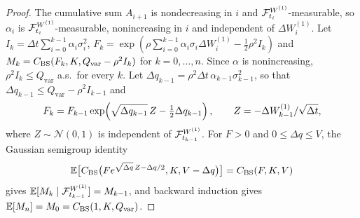 \begin{proof}
The cumulative sum $A_{i+1}$ is nondecreasing in $i$ and $\mathcal{F}_{t_i}^{W^{(1)}}$-measurable, so $\alpha_i$ is $\mathcal{F}_{t_i}^{W^{(1)}}$-measurable, nonincreasing in $i$ and independent of $\Delta W_i^{(1)}$. Let $I_k=\Delta t\sum_{i=0}^{k-1}\alpha_i\sigma_i^2$, $F_k=\exp(\rho\sum_{i=0}^{k-1}\alpha_i\sigma_i\Delta W_i^{(1)}-\tfrac12\rho^2 I_k)$ and $M_k=C_{\mathrm{BS}}(F_k,K,Q_{\mathrm{var}}-\rho^2 I_k)$ for $k=0,\dots,n$. Since $\alpha$ is nonincreasing, $\rho^2I_k\le Q_{\mathrm{var}}$ a.s.\ for every $k$. Let $\Delta q_{k-1}=\rho^2\Delta t\,\alpha_{k-1}\sigma_{k-1}^2$, so that $\Delta q_{k-1}\le Q_{\mathrm{var}}-\rho^2 I_{k-1}$ and
\[
  \begin{gathered}
  F_k=F_{k-1}\exp\!\left(\sqrt{\Delta q_{k-1}}\,Z-\tfrac12\Delta q_{k-1}\right),\qquad Z=-\Delta W_{k-1}^{(1)}/\sqrt{\Delta t},
  \end{gathered}
\]
where $Z\sim\mathcal{N}(0,1)$ is independent of $\mathcal{F}_{t_{k-1}}^{W^{(1)}}$. For $F>0$ and $0\le\Delta q\le V$, the Gaussian semigroup identity
\[
  \mathbb{E}\bigl[C_{\mathrm{BS}}\bigl(F e^{\sqrt{\Delta q}\,Z-\Delta q/2},K,V-\Delta q\bigr)\bigr]=C_{\mathrm{BS}}(F,K,V)
\]
gives $\mathbb{E}[M_k\mid\mathcal{F}_{t_{k-1}}^{W^{(1)}}]=M_{k-1}$, and backward induction gives $\mathbb{E}[M_n]=M_0=C_{\mathrm{BS}}(1,K,Q_{\mathrm{var}})$.
\end{proof}

